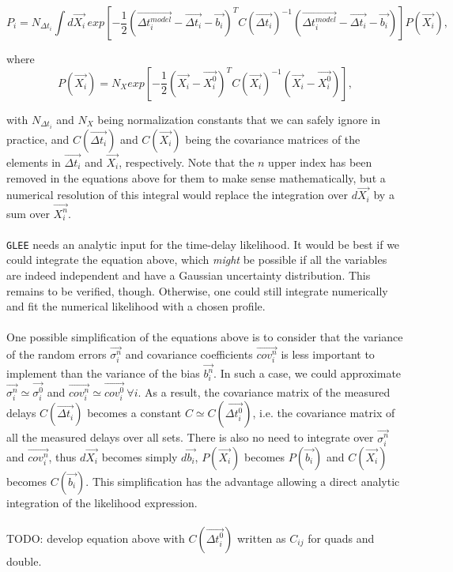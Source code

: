 \documentclass[11pt]{scrartcl}
\renewcommand{\vec}{\overrightarrow}  %
\begin{document}
\begin{equation*}
 P_i = N_{\Delta 
t_{i}}\int d\vec{X_i}\,exp\left[-\frac{1}{2}(\vec{\Delta 
t_i^{model}}-\vec{\Delta t_i}-\vec{b_i})^T C(\vec{\Delta 
t_i})^{-1}(\vec{\Delta 
t_i^{model}}-\vec{\Delta t_i}-\vec{b_i})  \right]P(\vec{X_i}),
\end{equation*}


where
\begin{equation*}
 P(\vec{X_i}) = N_Xexp\left[-\frac{1}{2} (\vec{X_i}-\vec{X_i^0})^T 
C(\vec{X_i})^{-1} (\vec{X_i}-\vec{X_i^0})\right],
\end{equation*}

with $N_{\Delta 
t_{i}}$ and $N_X$ being normalization constants that we can safely 
ignore in practice, and $C(\vec{\Delta 
t_i})$ and $C(\vec{X_i})$ being the covariance matrices of 
the elements in $\vec{\Delta 
t_i}$ and $\vec{X_i}$, respectively. Note that the $n$ upper 
index has been removed in the equations above for them to make sense 
mathematically, but a numerical resolution of this integral would 
replace the integration over $d\vec{X_i}$ by a sum over $\vec{X_i^n}$.\\
\\
\texttt{GLEE} needs an analytic input for the time-delay likelihood. It 
would be best if we could integrate the equation above, which 
\emph{might} be possible if all the variables are indeed independent 
and have a Gaussian uncertainty distribution. This remains to be 
verified, though. Otherwise, one could still integrate numerically and 
fit the numerical likelihood with a chosen profile.\\
\\
One possible simplification of the equations above is to consider that 
the variance of the random errors $\vec{\sigma^n_i}$ and covariance 
coefficients $\vec{cov^n_i}$ is less important to implement than the 
variance of the bias $\vec{b^n_i}$. In such a case, we could 
approximate $\vec{\sigma^n_i} \simeq \vec{\sigma^0_i}$ and 
$\vec{cov^n_i} \simeq \vec{cov^0_i} \ \forall i$. As a result, the 
covariance matrix of the measured delays $C(\vec{\Delta 
t_i})$ becomes a constant $C \simeq C(\vec{\Delta 
t^0_i})$, i.e. the covariance matrix of all the measured delays over 
all sets. There is also no need to integrate over $\vec{\sigma^n_i}$ 
and $\vec{cov^n_i}$, thus $d\vec{X_i}$ becomes simply $d\vec{b_i}$, 
$P(\vec{X_i})$ becomes $P(\vec{b_i})$ and $C(\vec{X_i})$ becomes 
$C(\vec{b_i})$. This simplification has the advantage allowing a direct 
analytic integration of the likelihood expression.   \\
\\
TODO: develop equation above with $C(\vec{\Delta t^0_i})$ written as 
$C_{ij}$ for quads and double.
\end{document}
